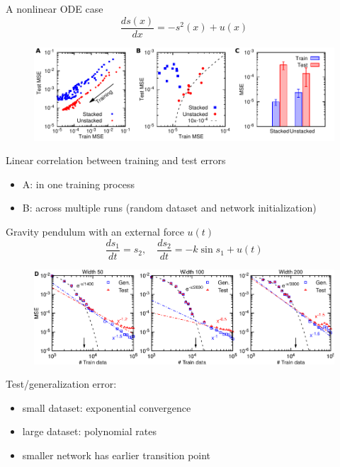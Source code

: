 \documentclass{beamer}
\begin{document}
\begin{frame}{A nonlinear ODE case}
$$\frac{ds(x)}{dx} = -s^2(x) + u(x)$$ \pause
\begin{figure}
\centering
\includegraphics[width=.9\textwidth]{ode_stacked.pdf}
\end{figure}
Linear correlation between training and test errors
\begin{itemize}
\item A: in one training process \pause
\item B: across multiple runs (random dataset and network initialization)
\end{itemize}
\end{frame}

\begin{frame}{Gravity pendulum with an external force $u(t)$}
\begin{equation*}
\frac{ds_1}{dt} = s_2, \quad \frac{ds_2}{dt} = -k\sin s_1 + u(t)
\end{equation*}
\begin{figure}
\centering
\includegraphics[width=.9\textwidth]{t.pdf}
\end{figure}
Test/generalization error:
\begin{itemize}
    \item small dataset: exponential convergence
    \item large dataset: polynomial rates
    \item smaller network has earlier transition point
\end{itemize}
\end{frame}
\end{document}

